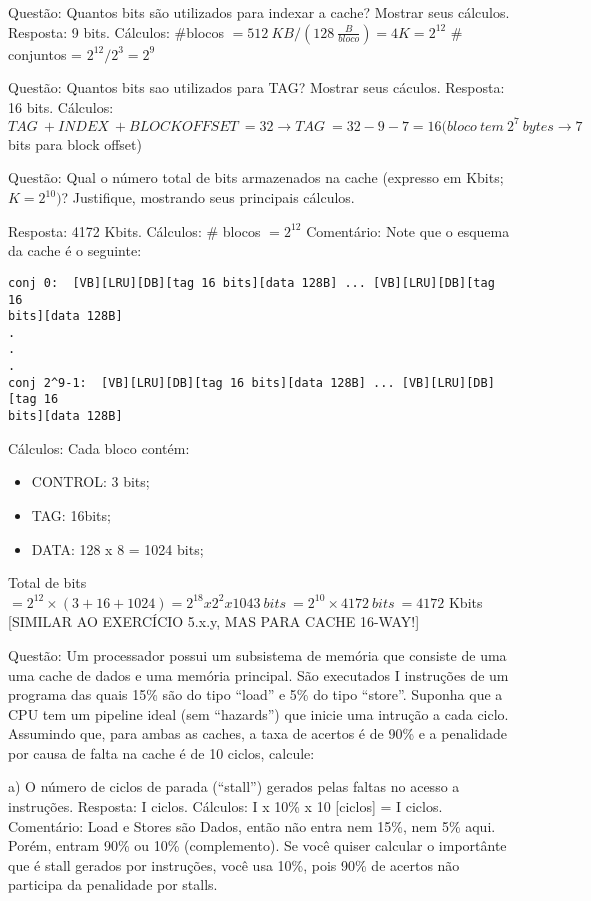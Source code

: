 \documentclass{article}
\begin{document}
Questão: Quantos bits são utilizados para indexar a cache? Mostrar seus
cálculos. Resposta: 9 bits. Cálculos: \#blocos $= 512\ KB / (128\
\frac{B}{bloco}) = 4K = 2^{12}$ \# conjuntos = $2^{12} / 2^{3} = 2^{9}$


Questão: Quantos bits sao utilizados para TAG? Mostrar seus cáculos. Resposta:
16 bits. Cálculos: $TAG\ + INDEX\ + BLOCK OFFSET\ = 32 \rightarrow TAG\ = 32 - 9
- 7 = 16 (bloco\ tem\ 2^{7}\ bytes \rightarrow 7$ bits para block offset)


Questão: Qual o número total de bits armazenados na cache (expresso em Kbits; $K
= 2^{10})$? Justifique, mostrando seus principais cálculos.

Resposta: 4172 Kbits. Cálculos: \# blocos $= 2^{12}$
Comentário: Note que o esquema da cache é o seguinte:

\begin{verbatim}
conj 0:  [VB][LRU][DB][tag 16 bits][data 128B] ... [VB][LRU][DB][tag 16
bits][data 128B]
.
.
.
conj 2^9-1:  [VB][LRU][DB][tag 16 bits][data 128B] ... [VB][LRU][DB][tag 16
bits][data 128B]
\end{verbatim}

Cálculos: Cada bloco contém:
\begin{itemize}
\item CONTROL: 3 bits;
\item TAG: 16bits;
\item DATA: 128 x 8 = 1024 bits;
\end{itemize}
Total de bits $= 2^{12} \times (3+16+1024) = 2^{18} x 2^{2} x 1043\ bits\ =
2^{10} \times 4172\ bits\ = 4172$ Kbits [SIMILAR AO EXERCÍCIO 5.x.y, MAS PARA
CACHE 16-WAY!]

Questão: Um processador possui um subsistema de memória que consiste de uma uma
cache de dados e uma memória principal. São executados I instruções de um
programa das quais 15\% são do tipo “load” e 5\% do tipo “store”. Suponha que a
CPU tem um pipeline ideal (sem “hazards”) que inicie uma intrução a cada ciclo.
Assumindo que, para ambas as caches, a taxa de acertos é de 90\% e a penalidade
por causa de falta na cache é de 10 ciclos, calcule:

a) O número de ciclos de parada (“stall”) gerados pelas faltas no acesso a
instruções. Resposta: I ciclos. Cálculos: I x 10\% x 10 [ciclos] = I ciclos.
Comentário: Load e Stores são Dados, então não entra nem 15\%, nem 5\% aqui.
Porém, entram 90\% ou 10\% (complemento). Se você quiser calcular o importânte
que é stall gerados por instruções, você usa 10\%, pois 90\% de acertos não
participa da penalidade por stalls.
\end{document}

